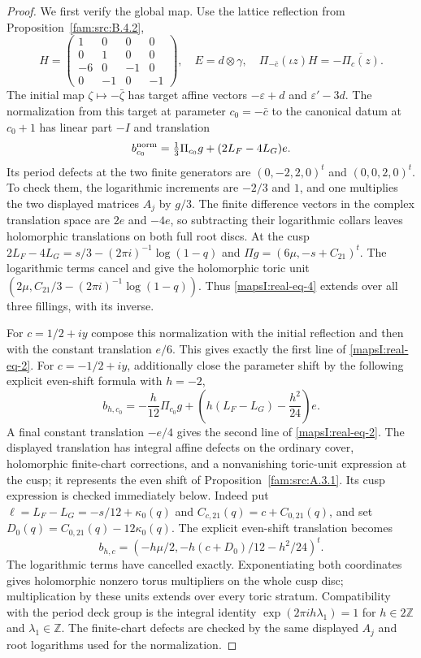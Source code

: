\begin{proof}
We first verify the global map. Use the lattice reflection from Proposition~\ref{fam:src:B.4.2},
\[
 H=\begin{pmatrix}1&0&0&0\\0&1&0&0\\-6&0&-1&0\\0&-1&0&-1\end{pmatrix},
 \quad E=d\otimes\gamma,
 \quad\Pi_{-\bar c}(\iota z)H=-\overline{\Pi_c(z)}.
\]
The initial map $\zeta\mapsto-\bar\zeta$ has target affine vectors
$-\varepsilon+d$ and $\varepsilon'-3d$. The normalization from this
target at parameter $c_0=-\bar c$ to the canonical datum at $c_0+1$
has linear part $-I$ and translation
\[
 b^{\rm norm}_{c_0}=\tfrac13\Pi_{c_0}g+(2L_F-4L_G)e.
 \label{mapsI:real-eq-4}
\]
Its period defects at the two finite generators are
$(0,-2,2,0)^t$ and $(0,0,2,0)^t$. To check them, the logarithmic increments
are $-2/3$ and $1$, and one multiplies the two displayed matrices $A_j$
by $g/3$. The finite difference vectors in the complex translation space are $2e$ and $-4e$, so subtracting
their logarithmic collars leaves holomorphic translations on both full
root discs. At the cusp
$2L_F-4L_G=s/3-(2\pi i)^{-1}\log(1-q)$ and
$\Pi g=(6\mu,-s+C_{21})^t$. The logarithmic terms cancel and give the
holomorphic toric unit
$(2\mu,C_{21}/3-(2\pi i)^{-1}\log(1-q))$.
Thus \eqref{mapsI:real-eq-4} extends over all three fillings, with its inverse.

For $c=1/2+iy$ compose this normalization with the initial reflection
and then with the constant translation $e/6$. This gives exactly the
first line of \eqref{mapsI:real-eq-2}. For $c=-1/2+iy$, additionally close the parameter
shift by the following explicit even-shift formula with $h=-2$,
\[
 b_{h,c_0}=-\frac h{12}\Pi_{c_0}g+
 \left(h(L_F-L_G)-\frac{h^2}{24}\right)e.
\]
A final constant translation $-e/4$ gives the second line of \eqref{mapsI:real-eq-2}.
The displayed translation has integral affine defects on the ordinary cover, holomorphic finite-chart corrections, and a nonvanishing toric-unit expression at the cusp; it represents the even shift of Proposition~\ref{fam:src:A.3.1}. Its cusp expression is checked immediately below. Indeed put $\ell=L_F-L_G=-s/12+\kappa_0(q)$ and
$C_{c,21}(q)=c+C_{0,21}(q)$, and set
$D_0(q)=C_{0,21}(q)-12\kappa_0(q)$.
The explicit even-shift translation becomes
\[
 b_{h,c}=
 \left(-h\mu/2,-h(c+D_0)/12-h^2/24\right)^t.
\]
The logarithmic terms have cancelled exactly. Exponentiating both
coordinates gives holomorphic nonzero torus multipliers on the whole cusp
disc; multiplication by these units extends over every toric stratum.
Compatibility with the period deck group is the integral identity
$\exp(2\pi i h\lambda_1)=1$ for $h\in2\mathbb Z$ and
$\lambda_1\in\mathbb Z$. The finite-chart defects are checked by the
same displayed $A_j$ and root logarithms used for the normalization.


\end{proof}
